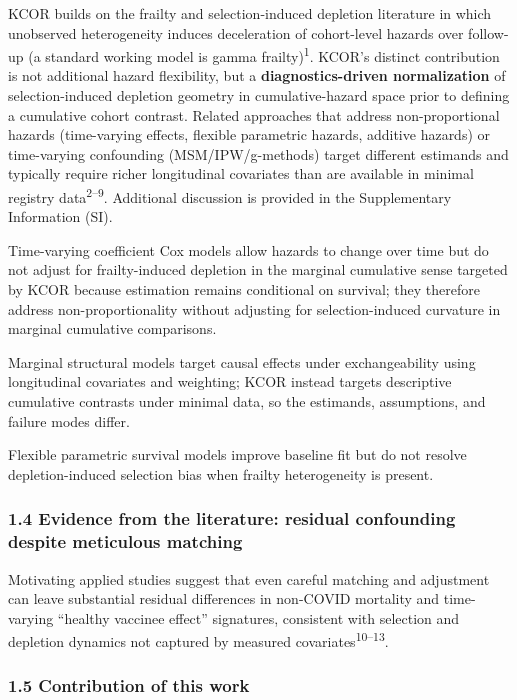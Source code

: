 \documentclass[
]{article}
\begin{document}
KCOR builds on the frailty and selection-induced depletion literature in
which unobserved heterogeneity induces deceleration of cohort-level
hazards over follow-up (a standard working model is gamma
frailty)\textsuperscript{1}. KCOR's distinct contribution is not
additional hazard flexibility, but a \textbf{diagnostics-driven
normalization} of selection-induced depletion geometry in
cumulative-hazard space prior to defining a cumulative cohort contrast.
Related approaches that address non-proportional hazards (time-varying
effects, flexible parametric hazards, additive hazards) or time-varying
confounding (MSM/IPW/g-methods) target different estimands and typically
require richer longitudinal covariates than are available in minimal
registry data\textsuperscript{2--9}. Additional discussion is provided
in the Supplementary Information (SI).

Time-varying coefficient Cox models allow hazards to change over time
but do not adjust for frailty-induced depletion in the marginal
cumulative sense targeted by KCOR because estimation remains conditional
on survival; they therefore address non-proportionality without
adjusting for selection-induced curvature in marginal cumulative
comparisons.

Marginal structural models target causal effects under exchangeability
using longitudinal covariates and weighting; KCOR instead targets
descriptive cumulative contrasts under minimal data, so the estimands,
assumptions, and failure modes differ.

Flexible parametric survival models improve baseline fit but do not
resolve depletion-induced selection bias when frailty heterogeneity is
present.

\subsubsection{1.4 Evidence from the literature: residual confounding
despite meticulous
matching}\label{evidence-from-the-literature-residual-confounding-despite-meticulous-matching}

Motivating applied studies suggest that even careful matching and
adjustment can leave substantial residual differences in non-COVID
mortality and time-varying ``healthy vaccinee effect'' signatures,
consistent with selection and depletion dynamics not captured by
measured covariates\textsuperscript{10--13}.

\subsubsection{1.5 Contribution of this
work}\label{contribution-of-this-work}
\end{document}

